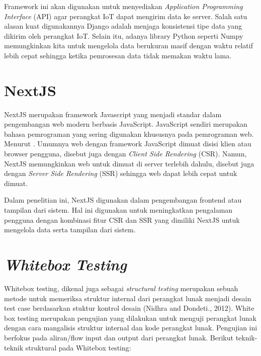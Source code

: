 Framework ini akan digunakan untuk menyediakan \textit{Application Programming Interface} (API) agar perangkat IoT dapat mengirim data ke server. Salah satu alasan kuat digunakannya Django adalah menjaga konsistensi tipe data yang dikirim oleh perangkat IoT. Selain itu, adanya library Python seperti Numpy memungkinkan kita untuk mengelola data berukuran masif dengan waktu relatif lebih cepat sehingga ketika pemrosesan data tidak memakan waktu lama.

\section{NextJS}

\noindent NextJS merupakan framework Javascript yang menjadi standar dalam pengembangan web modern berbasis JavaScript. JavaScript sendiri merupakan bahasa pemrograman yang sering digunakan khususnya pada pemrograman web. Menurut \textcite{article:tomasdottir}. Umumnya web dengan framework JavaScript dimuat disisi klien atau browser pengguna, disebut juga dengan \textit{Client Side Rendering}  (CSR). Namun, NextJS memungkinkan web untuk dimuat di server terlebih dahulu, disebut juga dengan \textit{Server Side Rendering} (SSR) sehingga web dapat lebih cepat untuk dimuat.

Dalam penelitian ini, NextJS digunakan dalam pengembangan frontend atau tampilan dari sistem. Hal ini digunakan untuk meningkatkan pengalaman pengguna dengan kombinasi fitur CSR dan SSR yang dimiliki NextJS untuk mengelola data serta tampilan dari sistem.

\section{\textit{Whitebox Testing}}

Whitebox testing, dikenal juga sebagai \textit{structural testing} merupakan sebuah metode untuk memeriksa struktur internal dari perangkat lunak menjadi desain test case berdasarkan stuktur kontrol desain (Nidhra and Dondeti., 2012). White box testing merupakan pengujian yang dilakukan untuk menguji perangkat lunak dengan cara mangalisis struktur internal dan kode perangkat lunak. Pengujian ini berfokus pada aliran/flow input dan output dari perangkat lunak. Berikut teknik-teknik struktural pada Whitebox testing:

